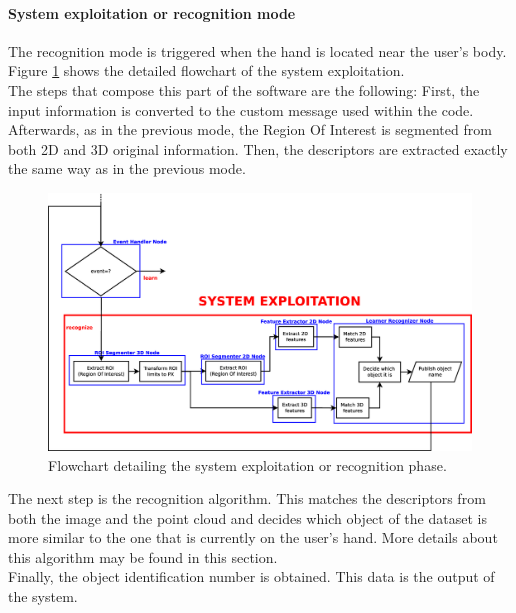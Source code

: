\paragraph{System exploitation or recognition mode}\mbox{}


The recognition mode is triggered when the hand is located near the user's body. 
Figure \ref{flowchart3} shows the detailed flowchart of the system exploitation. 
\\
The steps that compose this part of the software are the following: 
First, the input information is converted to the custom message used within the code. Afterwards, as in the previous mode, the Region Of Interest is segmented from both 2D and 3D original information. Then, the descriptors are extracted exactly the same way as in the previous mode. 
\\

\begin{figure}[H]
	\begin{center}
\includegraphics[width=\linewidth]{img/diagrams/flowchart3.eps}
	\caption[System exploitation flowchart]{Flowchart detailing the system exploitation or recognition phase.}
		\label{flowchart3}

	\end{center}
\end{figure}



The next step is the recognition algorithm. This matches the descriptors from both the image and the point cloud and decides which object of the dataset is more similar to the one that is currently on the user's hand. More details about this algorithm may be found in this section. 
\\

Finally, the object identification number is obtained. This data is the output of the system. 
